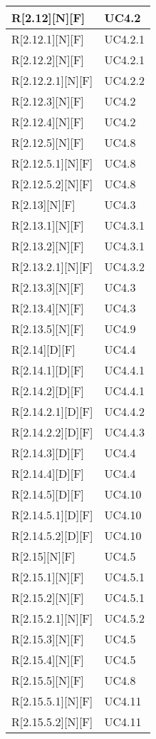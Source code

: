 \begin{longtable}{X | X}
\hline
R[2.12][N][F] & UC4.2 \\
\hline
R[2.12.1][N][F] & UC4.2.1 \\
\hline
R[2.12.2][N][F] & UC4.2.1 \\
\hline
R[2.12.2.1][N][F] & UC4.2.2 \\
\hline
R[2.12.3][N][F] & UC4.2 \\
\hline
R[2.12.4][N][F] & UC4.2 \\
\hline
R[2.12.5][N][F] & UC4.8 \\
\hline
R[2.12.5.1][N][F] & UC4.8 \\
\hline
R[2.12.5.2][N][F] & UC4.8 \\
\hline
R[2.13][N][F] & UC4.3 \\
\hline
R[2.13.1][N][F] & UC4.3.1 \\
\hline
R[2.13.2][N][F] & UC4.3.1 \\
\hline
R[2.13.2.1][N][F] & UC4.3.2 \\
\hline
R[2.13.3][N][F] & UC4.3 \\
\hline
R[2.13.4][N][F] & UC4.3 \\
\hline
R[2.13.5][N][F] & UC4.9 \\
\hline
R[2.14][D][F] & UC4.4 \\
\hline
R[2.14.1][D][F] & UC4.4.1 \\
\hline
R[2.14.2][D][F] & UC4.4.1 \\
\hline
R[2.14.2.1][D][F] & UC4.4.2 \\
\hline
R[2.14.2.2][D][F] & UC4.4.3 \\
\hline
R[2.14.3][D][F] & UC4.4 \\
\hline
R[2.14.4][D][F] & UC4.4 \\
\hline
R[2.14.5][D][F] & UC4.10 \\
\hline
R[2.14.5.1][D][F] & UC4.10 \\
\hline
R[2.14.5.2][D][F] & UC4.10 \\
\hline
R[2.15][N][F] & UC4.5 \\
\hline
R[2.15.1][N][F] & UC4.5.1 \\
\hline
R[2.15.2][N][F] & UC4.5.1 \\
\hline
R[2.15.2.1][N][F] & UC4.5.2 \\
\hline
R[2.15.3][N][F] & UC4.5 \\
\hline
R[2.15.4][N][F] & UC4.5 \\
\hline
R[2.15.5][N][F] & UC4.8 \\
\hline
R[2.15.5.1][N][F] & UC4.11 \\
\hline
R[2.15.5.2][N][F] & UC4.11 \\

\end{longtable}
